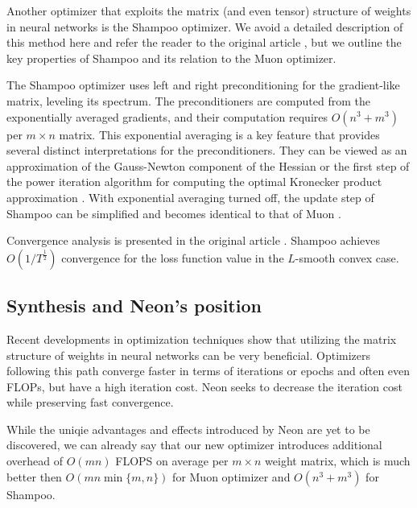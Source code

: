 \documentclass[]{scrartcl}
\begin{document}
Another optimizer that exploits the matrix (and even tensor) structure of weights in neural networks is the Shampoo optimizer. We avoid a detailed description of this method here and refer the reader to the original article \cite{gupta2018shampoopreconditionedstochastictensor}, but we outline the key properties of Shampoo and its relation to the Muon optimizer.

The Shampoo optimizer uses left and right preconditioning for the gradient-like matrix, leveling its spectrum. The preconditioners are computed from the exponentially averaged gradients, and their computation requires $O(n^3 + m^3)$ per $m \times n$ matrix. This exponential averaging is a key feature that provides several distinct interpretations for the preconditioners. They can be viewed as an approximation of the Gauss-Newton component of the Hessian or the first step of the power iteration algorithm for computing the optimal Kronecker product approximation \cite{morwani2025a}. With exponential averaging turned off, the update step of Shampoo can be simplified and becomes identical to that of Muon \cite{jordan2024muon}.

Convergence analysis is presented in the original article \cite{gupta2018shampoopreconditionedstochastictensor}. Shampoo achieves $O(1/T^{\frac{1}{2}})$ convergence for the loss function value in the $L$-smooth convex case.

\subsection{Synthesis and Neon's position}

Recent developments in optimization techniques show that utilizing the matrix structure of weights in neural networks can be very beneficial. Optimizers following this path converge faster in terms of iterations or epochs and often even FLOPs, but have a high iteration cost. Neon seeks to decrease the iteration cost while preserving fast convergence.

While the uniqie advantages and effects introduced by Neon are yet to be discovered, we can already say that our new optimizer introduces additional overhead of $O(mn)$ FLOPS on average per $m \times n$ weight matrix, which is much better then $O(m n \min\{m, n\})$ for Muon optimizer and $O(n^3 + m^3)$ for Shampoo. 
\end{document}
